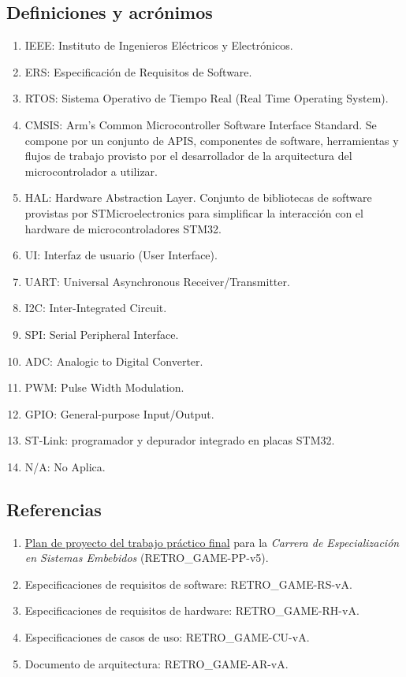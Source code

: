 \documentclass[11pt,a4paper]{article}
\begin{document}
\subsection{Definiciones y acrónimos}
  \begin{enumerate}
    \item IEEE: Instituto de Ingenieros Eléctricos y Electrónicos.
    \item ERS: Especificación de Requisitos de Software.
    \item RTOS: Sistema Operativo de Tiempo Real (Real Time Operating System).
    \item CMSIS: Arm's Common Microcontroller Software Interface Standard. Se compone por un conjunto de APIS, componentes de software, herramientas y flujos de trabajo provisto por el desarrollador de la arquitectura del microcontrolador a utilizar.
    \item HAL: Hardware Abstraction Layer. Conjunto de bibliotecas de software provistas por STMicroelectronics para simplificar la interacción con el hardware de microcontroladores STM32.
    \item UI: Interfaz de usuario (User Interface).
    \item UART: Universal Asynchronous Receiver/Transmitter. 
    \item I2C: Inter-Integrated Circuit.
    \item SPI: Serial Peripheral Interface.
    \item ADC: Analogic to Digital Converter.
    \item PWM: Pulse Width Modulation.
    \item GPIO: General-purpose Input/Output.
    \item ST-Link: programador y depurador integrado en placas STM32.
    \item N/A: No Aplica.
  \end{enumerate}

\subsection{Referencias}

\begin{enumerate}
  \item \href{https://drive.google.com/file/d/1C3vEYR8wME6EzlZVVC-gT2u86dwnoZA-/view?usp=sharing}{Plan de proyecto del trabajo práctico final} para la \textit{Carrera de Especialización en Sistemas Embebidos} (RETRO\_GAME-PP-v5). 
  \item Especificaciones de requisitos de software: RETRO\_GAME-RS-vA.
  \item Especificaciones de requisitos de hardware: RETRO\_GAME-RH-vA.
  \item Especificaciones de casos de uso: RETRO\_GAME-CU-vA.
  \item Documento de arquitectura: RETRO\_GAME-AR-vA.
\end{enumerate}
\end{document}

